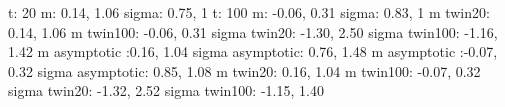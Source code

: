  t: 20 m: 0.14, 1.06 sigma: 0.75,  1 t: 100 m: -0.06, 0.31 sigma: 0.83,  1 m twin20: 0.14, 1.06 m twin100: -0.06, 0.31 sigma twin20: -1.30, 2.50 sigma twin100: -1.16, 1.42 m asymptotic :0.16, 1.04 sigma asymptotic: 0.76, 1.48 m asymptotic :-0.07, 0.32 sigma asymptotic: 0.85, 1.08 m twin20: 0.16, 1.04 m twin100: -0.07, 0.32 sigma twin20: -1.32, 2.52 sigma twin100: -1.15, 1.40